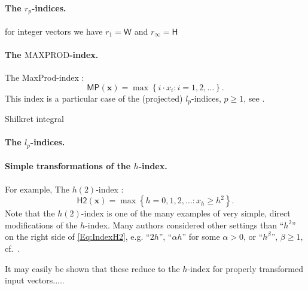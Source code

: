 \documentclass[11pt]{article}\usepackage{graphicx, color}
\newcommand{\vect}[1]{{\mathbf{#1}}}
\newcommand{\func}[1]{{\mathsf{#1}}}
\theoremstyle{remark}
\theoremstyle{definition}
\begin{document}
\paragraph{The $r_p$-indices.}\cite{GagolewskiGrzegorzewski2009:geometricapproach}
for integer vectors we have $r_1=\func{W}$ and $r_\infty=\func{H}$



\paragraph{The $\mathrm{MAXPROD}$-index.}
The MaxProd-index \cite{Kosmulski2007:maxprod}:
\begin{equation}\label{Eq:IndexMaxProd}
   \func{MP}(\vect{x}) = \max\left\{i\cdot{{x}}_{i}: i=1,2,\ldots\right\}.
\end{equation}
This index is a particular case of the (projected) $l_p$-indices, $p\ge 1$,
see \cite{GagolewskiGrzegorzewski2009:geometricapproach}.

Shilkret integral \cite{Shilkret1971:maxitivemeasure}



\paragraph{The $l_p$-indices.}\cite{GagolewskiGrzegorzewski2009:geometricapproach}


\paragraph{Simple transformations of the $h$-index.}
For example, The $h(2)$-index \cite{Kosmulski2006:h2}:
\begin{equation}\label{Eq:IndexH2}
\func{H2}(\vect{x}) = \max\left\{h=0,1,2,\ldots: {x}_{h} \ge h^2\right\}. %
\end{equation}
Note that the $h(2)$-index is one of the many examples of very
simple, direct modifications of the $h$-index.
Many authors considered other settings than ``$h^2$'' on the right
side of \eqref{Eq:IndexH2}, e.g. ``$2h$'', ``$\alpha h$'' for some
$\alpha > 0$, or ``$h^\beta$'', $\beta\ge 1$, cf.~\cite{AlonsoETAL2009:hreview}.

It may easily be shown that these reduce to the $h$-index for
properly transformed input vectors.....

\end{document}
